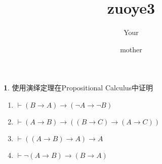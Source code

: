 \documentclass[a4paper, 12pt]{ctexart} %
\title{zuoye3}
\author{Your \and mother}
\theoremstyle{plain}
\theoremstyle{definition}
\newtheorem{num}{}
\theoremstyle{remark}
\begin{document}
\maketitle
\begin{num}
使用演绎定理在Propositional Calculus中证明
\begin{enumerate}
    \item[(1)] $\vdash \left(B \to A \right) \to \left( \neg A \to \neg B\right)$
    \item[(2)] $\vdash \left(A \to B\right) \to \left( \left( B \to C\right) \to \left(A \to C\right)\right)$ 
    \item[(3)] $\vdash \left(\left(A \to B\right) \to A      \right) \to A  $ 
    \item[(4)] $\vdash \neg \left(A \to B   \right) \to \left(B \to A\right)$
\end{enumerate}
\end{num}
\end{document}
